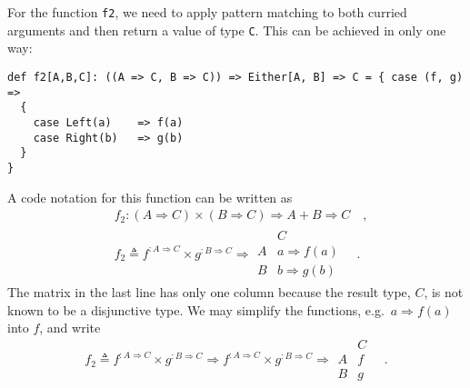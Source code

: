 For the function \lstinline!f2!, we need to apply pattern matching
to both curried arguments and then return a value of type \lstinline!C!.
This can be achieved in only one way:
\begin{lstlisting}
def f2[A,B,C]: ((A => C, B => C)) => Either[A, B] => C = { case (f, g) =>
  {
    case Left(a)    => f(a)
    case Right(b)   => g(b)
  }
}
\end{lstlisting}
A code notation for this function can be written as
\begin{align*}
 & f_{2}:\left(A\Rightarrow C\right)\times\left(B\Rightarrow C\right)\Rightarrow A+B\Rightarrow C\quad,\\
 & f_{2}\triangleq f^{:A\Rightarrow C}\times g^{:B\Rightarrow C}\Rightarrow\begin{array}{|c||c|}
 & C\\
\hline A & a\Rightarrow f(a)\\
B & b\Rightarrow g(b)
\end{array}\quad.
\end{align*}
The matrix in the last line has only one column because the result
type, $C$, is not known to be a disjunctive type. We may simplify
the functions, e.g.~$a\Rightarrow f(a)$ into $f$, and write
\[
f_{2}\triangleq f^{:A\Rightarrow C}\times g^{:B\Rightarrow C}\Rightarrow f^{:A\Rightarrow C}\times g^{:B\Rightarrow C}\Rightarrow\begin{array}{|c||c|}
 & C\\
\hline A & f\\
B & g
\end{array}\quad.
\]

